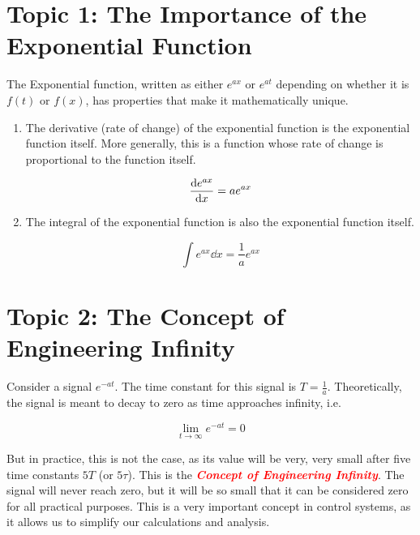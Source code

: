 \documentclass[
  12pt,
  a4paper,
]{report}
\begin{document}
\newpage{}

\section{Topic 1: The Importance of the Exponential
Function}\label{topic-1-the-importance-of-the-exponential-function}

The Exponential function, written as either \(e^{ax}\) or \(e^{at}\)
depending on whether it is \(f(t)\) or \(f(x)\), has properties that
make it mathematically unique.

\begin{enumerate}
\def\labelenumi{\arabic{enumi}.}
\item
  The derivative (rate of change) of the exponential function is the
  exponential function itself. More generally, this is a function whose
  rate of change is proportional to the function itself.

  \begin{equation} 
  \label{eq:exp-derivative}     
  \dv{e^{ax}}{x} = a e^{ax} 
  \end{equation}
\item
  The integral of the exponential function is also the exponential
  function itself.

  \begin{equation} 
  \label{eq:exp-integral}     
  \int e^{ax} \dd{x} = \frac{1}{a} e^{ax} 
  \end{equation}
\end{enumerate}

\section{Topic 2: The Concept of Engineering
Infinity}\label{topic-2-the-concept-of-engineering-infinity}

Consider a signal \(e^{-at}\). The time constant for this signal is
\(T = \frac{1}{a}\). Theoretically, the signal is meant to decay to zero
as time approaches infinity, i.e.

\begin{equation} 
\label{eq:eng-infinity}     
\lim_{t \to \infty} e^{-at} = 0  
\end{equation}

But in practice, this is not the case, as its value will be very, very
small after five time constants \(5T\) (or \(5\tau\)). This is the
\textcolor{red}{\textbf{\textit{Concept of Engineering Infinity}}}. The
signal will never reach zero, but it will be so small that it can be
considered zero for all practical purposes. This is a very important
concept in control systems, as it allows us to simplify our calculations
and analysis.
\end{document}
